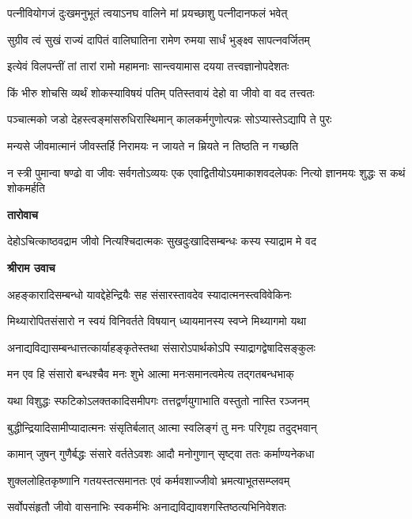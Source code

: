 \twolineshloka
{पत्नीवियोगजं दुःखमनुभूतं त्वयाऽनघ}
{वालिने मां प्रयच्छाशु पत्नीदानफलं भवेत्} %

\twolineshloka
{सुग्रीव त्वं सुखं राज्यं दापितं वालिघातिना}
{रामेण रुमया सार्धं भुङ्क्ष्व सापत्नवर्जितम्} %

\twolineshloka
{इत्येवं विलपन्तीं तां तारां रामो महामनाः}
{सान्त्वयामास दयया तत्त्वज्ञानोपदेशतः} %

\twolineshloka
{किं भीरु शोचसि व्यर्थं शोकस्याविषयं पतिम्}
{पतिस्तवायं देहो वा जीवो वा वद तत्त्वतः} %

\twolineshloka
{पञ्चात्मको जडो देहस्त्वङ्मांसरुधिरास्थिमान्}
{कालकर्मगुणोत्पन्नः सोऽप्यास्तेऽद्यापि ते पुरः} %

\twolineshloka
{मन्यसे जीवमात्मानं जीवस्तर्हि निरामयः}
{न जायते न म्रियते न तिष्ठति न गच्छति} %

\threelineshloka
{न स्त्री पुमान्वा षण्ढो वा जीवः सर्वगतोऽव्ययः}
{एक एवाद्वितीयोऽयमाकाशवदलेपकः}
{नित्यो ज्ञानमयः शुद्धः स कथं शोकमर्हति} %

\textbf{तारोवाच}

\twolineshloka
{देहोऽचित्काष्ठवद्राम जीवो नित्यश्चिदात्मकः}
{सुखदुःखादिसम्बन्धः कस्य स्याद्राम मे वद} %

\textbf{श्रीराम उवाच}

\twolineshloka
{अहङ्कारादिसम्बन्धो यावद्देहेन्द्रियैः सह}
{संसारस्तावदेव स्यादात्मनस्त्वविवेकिनः} %

\twolineshloka
{मिथ्यारोपितसंसारो न स्वयं विनिवर्तते}
{विषयान् ध्यायमानस्य स्वप्ने मिथ्यागमो यथा} %

\twolineshloka
{अनाद्यविद्यासम्बन्धात्तत्कार्याहङ्कृतेस्तथा}
{संसारोऽपार्थकोऽपि स्याद्रागद्वेषादिसङ्कुलः} %

\twolineshloka
{मन एव हि संसारो बन्धश्चैव मनः शुभे}
{आत्मा मनःसमानत्वमेत्य तद्गतबन्धभाक्} %

\twolineshloka
{यथा विशुद्धः स्फटिकोऽलक्तकादिसमीपगः}
{तत्तद्वर्णयुगाभाति वस्तुतो नास्ति रञ्जनम्} %

\twolineshloka
{बुद्धीन्द्रियादिसामीप्यादात्मनः संसृतिर्बलात्}
{आत्मा स्वलिङ्गं तु मनः परिगृह्य तदुद्भवान्} %

\twolineshloka
{कामान् जुषन् गुणैर्बद्धः संसारे वर्ततेऽवशः}
{आदौ मनोगुणान् सृष्ट्वा ततः कर्माण्यनेकधा} %

\twolineshloka
{शुक्ललोहितकृष्णानि गतयस्तत्समानतः}
{एवं कर्मवशाज्जीवो भ्रमत्याभूतसम्प्लवम्} %

\twolineshloka
{सर्वोपसंहृतौ जीवो वासनाभिः स्वकर्मभिः}
{अनाद्यविद्यावशगस्तिष्ठत्यभिनिवेशतः} %

